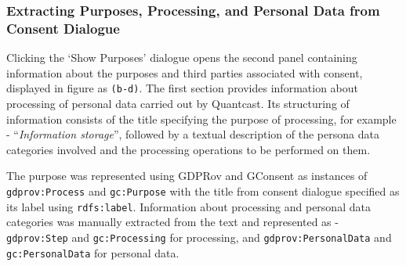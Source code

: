 \subsubsection{Extracting Purposes, Processing, and Personal Data from Consent Dialogue}
Clicking the `Show Purposes' dialogue opens the second panel containing information about the  purposes and third parties associated with consent, displayed in figure as \texttt{(b-d)}.
The first section provides information about processing of personal data carried out by Quantcast. Its structuring of information consists of the title specifying the purpose of processing, for example - ``\textit{Information storage}'', followed by a textual description of the persona data categories involved and the processing operations to be performed on them.

The purpose was represented using GDPRov and GConsent as instances of \texttt{gdprov:Process} and \texttt{gc:Purpose} with the title from consent dialogue specified as its label using \texttt{rdfs:label}. 
Information about processing and personal data categories was manually extracted from the text and represented as - \texttt{gdprov:Step} and \texttt{gc:Processing} for processing, and \texttt{gdprov:PersonalData} and \texttt{gc:PersonalData} for personal data.

